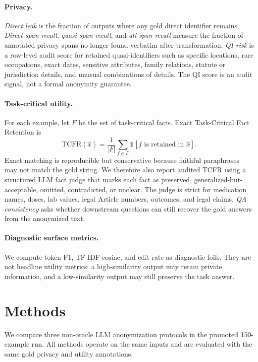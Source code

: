 \documentclass{article}
\newcommand{\tcfr}{TCFR}
\begin{document}
\paragraph{Privacy.}
\textit{Direct leak} is the fraction of outputs where any gold direct identifier
remains.  \textit{Direct span recall}, \textit{quasi span recall}, and
\textit{all-span recall} measure the fraction of annotated privacy spans no
longer found verbatim after transformation.  \textit{QI risk} is a row-level
audit score for retained quasi-identifiers such as specific locations, rare
occupations, exact dates, sensitive attributes, family relations, statute or
jurisdiction details, and unusual combinations of details.  The QI score is an
audit signal, not a formal anonymity guarantee.

\paragraph{Task-critical utility.}
For each example, let $F$ be the set of task-critical facts.  Exact
Task-Critical Fact Retention is
\begin{equation}
\mathrm{TCFR}(\hat{x}) = \frac{1}{|F|}\sum_{f \in F} \mathbb{1}[f \text{ is retained in } \hat{x}].
\end{equation}
Exact matching is reproducible but conservative because faithful paraphrases may
not match the gold string.  We therefore also report audited \tcfr{} using a
structured LLM fact judge that marks each fact as preserved,
generalized-but-acceptable, omitted, contradicted, or unclear.  The judge is
strict for medication names, doses, lab values, legal Article numbers, outcomes,
and legal claims.  \textit{QA consistency} asks whether downstream questions can
still recover the gold answers from the anonymized text.

\paragraph{Diagnostic surface metrics.}
We compute token F1, TF-IDF cosine, and edit rate as diagnostic foils.  They are
not headline utility metrics: a high-similarity output may retain private
information, and a low-similarity output may still preserve the task answer.

\section{Methods}

We compare three non-oracle LLM anonymization protocols in the promoted
150-example run.  All methods operate on the same inputs and are evaluated with
the same gold privacy and utility annotations.
\end{document}

